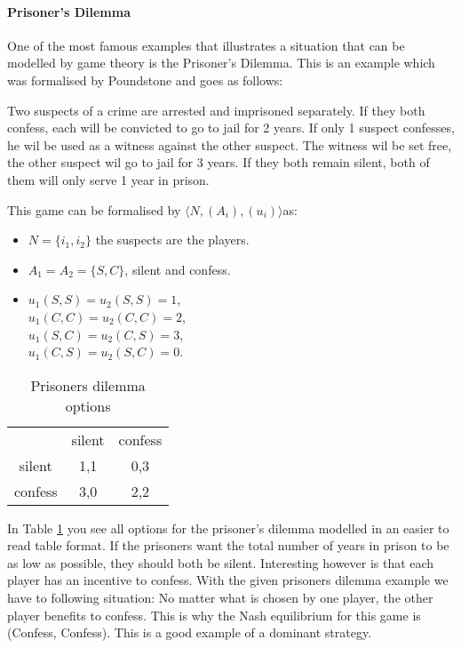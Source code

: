 \paragraph{Prisoner's Dilemma}
One of the most famous examples that illustrates a situation that can be modelled by game theory is the Prisoner's Dilemma. This is an example which was formalised by Poundstone \cite{poundstone} and goes as follows: 

Two suspects of a crime are arrested and imprisoned separately. If they both confess, each will be convicted to go to jail for 2 years. If only 1 suspect confesses, he wil be used as a witness against the other suspect. The witness wil be set free, the other suspect wil go to jail for 3 years. If they both remain silent, both of them will only serve 1 year in prison.

This game can be formalised by $\langle N, (A_i), (u_i) \rangle$as:
\begin{itemize}
	\item $N = \{i_{1}, i_{2} \}$ the suspects are the players.
    \item $A_1 = A_2 = \{S, C\}$, silent and confess.
    \item $u_1(S, S) = u_2(S, S) = 1$, \\
    $u_1(C, C) = u_2(C, C) = 2$, \\
    $u_1(S, C) = u_2(C, S) = 3$, \\
    $u_1(C, S) = u_2(S, C) = 0$.

\end{itemize}

\begin{table}[h]
\centering
\begin{tabular}{ccc}
                             & silent                   & confess                   \\ \cline{2-3} 
\multicolumn{1}{c|}{silent}  & \multicolumn{1}{c|}{1,1} & \multicolumn{1}{c|}{0,3} \\ \cline{2-3} 
\multicolumn{1}{c|}{confess} & \multicolumn{1}{c|}{3,0} & \multicolumn{1}{c|}{2,2} \\ \cline{2-3} 
\end{tabular}
\caption{Prisoners dilemma options}
\label{prisoners-d}
\end{table}

In Table \ref{prisoners-d} you see all options for the prisoner's dilemma modelled in an easier to read table format. If the prisoners want the total number of years in prison to be as low as possible, they should both be silent. Interesting however is that each player has an incentive to confess. With the given prisoners dilemma example we have to following situation: No matter what is chosen by one player, the other player benefits to confess. This is why the Nash equilibrium for this game is (Confess, Confess). This is a good example of a dominant strategy. 

